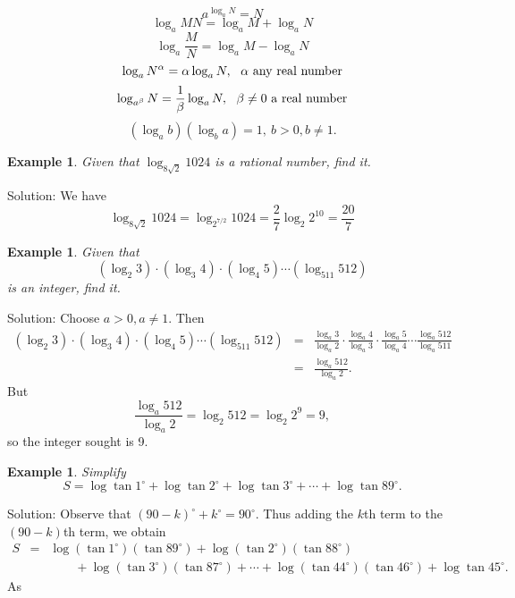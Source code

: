 \documentclass[11pt, openany]{book}
\theoremstyle{change} \theoremheaderfont{\blue\sffamily\bfseries}
\newtheorem{exa}[thm]{Example}
\theoremstyle{nonumberplain} \theoremheaderfont{\sffamily\bfseries}
\newcommand{\dis}{\displaystyle}
\newcommand{\í}{\'{\i}}
\begin{document}
\begin{equation} a^{\log _a N} = N \end{equation}
\begin{equation} \log _a MN = \log _a M + \log _a N \end{equation}
\begin{equation}    \log _a \frac{M}{N} = \log _a M - \log _a N \end{equation}
\begin{equation}  \log _a N^\alpha = \alpha\log _a N, \ \ \alpha
{\rm \ any \ real \ number} \end{equation}
\begin{equation} \log _{ a^\beta} N = \frac{1}{\beta} \log _a N, \ \ \beta \neq 0
{\rm \ a \ real \ number} \end{equation}
\begin{equation} (\log _a b)(\log _b a) = 1, \ b > 0, b \neq 1. \end{equation}
\begin{exa}
Given that  $\dis{\log _{8\sqrt{2}} 1024}$ is a rational number,
find it.
\end{exa}
Solution: We have
$$\log _{8\sqrt{2}} 1024 = \log _{2^{7/2}} 1024
= \frac{2}{7}\log _{2} 2^{10} =  \frac{20}{7} $$
\begin{exa} Given that $$ (\log _2 3)\cdot (\log _3 4)\cdot (\log _4 5) \cdots
(\log _{511} 512)$$is an integer, find it.
\end{exa}
Solution: Choose $a > 0, a \neq 1$. Then
$$\begin{array}{lll}(\log _2 3)\cdot (\log _3 4)\cdot (\log _4 5) \cdots (\log _{511} 512)
& = & \frac{\log _a 3}{\log _a 2}\cdot\frac{\log _a 4}{\log _a
3}\cdot \frac{\log _a 5}{\log _a 4}\cdots \frac{\log _a 512}{\log
_a 511}
\\ & = & \frac{\log _a 512}{\log _a 2}. \end{array}$$But
$$\frac{\log _a 512}{\log _a 2} = \log_2 512 = \log _2 2^9 = 9,$$so the integer sought is 9.
\begin{exa} Simplify $$S =  \log \tan 1^\circ + \log \tan 2^\circ + \log \tan 3^\circ +
\cdots + \log \tan 89^\circ .$$ \end{exa} Solution: Observe that
$(90 - k)^\circ + k^\circ = 90^\circ$. Thus adding the $k$th term
to the  $(90 - k)$th term, we obtain
$$\begin{array}{lcl}
S & = & \log (\tan 1^\circ)(\tan 89 ^\circ) + \log (\tan 2^\circ )(\tan 88^\circ ) \\
& & \qquad + \log (\tan 3^\circ)(\tan 87^\circ ) + \cdots + \log
(\tan 44^\circ )(\tan 46^\circ ) + \log \tan 45^\circ .
\end{array}$$As
\end{document}
